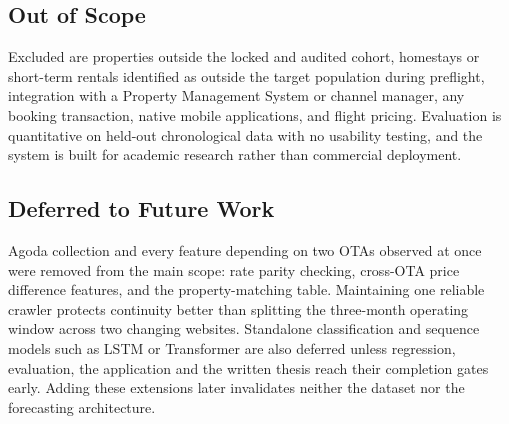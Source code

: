 \subsection{Out of Scope}

Excluded are properties outside the locked and audited cohort, homestays or short-term rentals identified as outside the target population during preflight, integration with a Property Management System or channel manager, any booking transaction, native mobile applications, and flight pricing. Evaluation is quantitative on held-out chronological data with no usability testing, and the system is built for academic research rather than commercial deployment.

\subsection{Deferred to Future Work}
\label{sec:deferred}

Agoda collection and every feature depending on two OTAs observed at once were removed from the main scope: rate parity checking, cross-OTA price difference features, and the property-matching table. Maintaining one reliable crawler protects continuity better than splitting the three-month operating window across two changing websites. Standalone classification and sequence models such as LSTM or Transformer are also deferred unless regression, evaluation, the application and the written thesis reach their completion gates early. Adding these extensions later invalidates neither the dataset nor the forecasting architecture.

\clearpage
